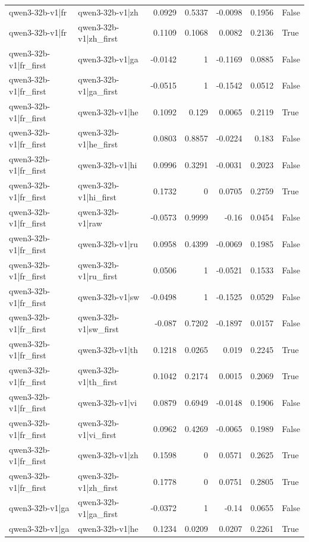 \begin{table}
\begin{tabular}{l l r r r r l}
qwen3-32b-v1|fr & qwen3-32b-v1|zh & 0.0929 & 0.5337 & -0.0098 & 0.1956 & False \\
qwen3-32b-v1|fr & qwen3-32b-v1|zh_first & 0.1109 & 0.1068 & 0.0082 & 0.2136 & True \\
qwen3-32b-v1|fr_first & qwen3-32b-v1|ga & -0.0142 & 1 & -0.1169 & 0.0885 & False \\
qwen3-32b-v1|fr_first & qwen3-32b-v1|ga_first & -0.0515 & 1 & -0.1542 & 0.0512 & False \\
qwen3-32b-v1|fr_first & qwen3-32b-v1|he & 0.1092 & 0.129 & 0.0065 & 0.2119 & True \\
qwen3-32b-v1|fr_first & qwen3-32b-v1|he_first & 0.0803 & 0.8857 & -0.0224 & 0.183 & False \\
qwen3-32b-v1|fr_first & qwen3-32b-v1|hi & 0.0996 & 0.3291 & -0.0031 & 0.2023 & False \\
qwen3-32b-v1|fr_first & qwen3-32b-v1|hi_first & 0.1732 & 0 & 0.0705 & 0.2759 & True \\
qwen3-32b-v1|fr_first & qwen3-32b-v1|raw & -0.0573 & 0.9999 & -0.16 & 0.0454 & False \\
qwen3-32b-v1|fr_first & qwen3-32b-v1|ru & 0.0958 & 0.4399 & -0.0069 & 0.1985 & False \\
qwen3-32b-v1|fr_first & qwen3-32b-v1|ru_first & 0.0506 & 1 & -0.0521 & 0.1533 & False \\
qwen3-32b-v1|fr_first & qwen3-32b-v1|sw & -0.0498 & 1 & -0.1525 & 0.0529 & False \\
qwen3-32b-v1|fr_first & qwen3-32b-v1|sw_first & -0.087 & 0.7202 & -0.1897 & 0.0157 & False \\
qwen3-32b-v1|fr_first & qwen3-32b-v1|th & 0.1218 & 0.0265 & 0.019 & 0.2245 & True \\
qwen3-32b-v1|fr_first & qwen3-32b-v1|th_first & 0.1042 & 0.2174 & 0.0015 & 0.2069 & True \\
qwen3-32b-v1|fr_first & qwen3-32b-v1|vi & 0.0879 & 0.6949 & -0.0148 & 0.1906 & False \\
qwen3-32b-v1|fr_first & qwen3-32b-v1|vi_first & 0.0962 & 0.4269 & -0.0065 & 0.1989 & False \\
qwen3-32b-v1|fr_first & qwen3-32b-v1|zh & 0.1598 & 0 & 0.0571 & 0.2625 & True \\
qwen3-32b-v1|fr_first & qwen3-32b-v1|zh_first & 0.1778 & 0 & 0.0751 & 0.2805 & True \\
qwen3-32b-v1|ga & qwen3-32b-v1|ga_first & -0.0372 & 1 & -0.14 & 0.0655 & False \\
qwen3-32b-v1|ga & qwen3-32b-v1|he & 0.1234 & 0.0209 & 0.0207 & 0.2261 & True \\

\end{tabular}
\end{table}

